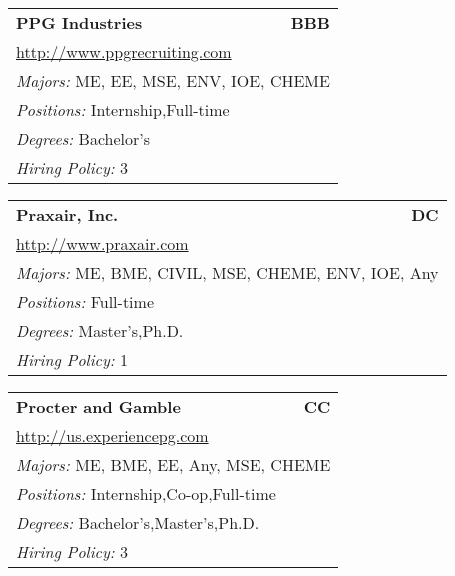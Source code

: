 \documentclass[twoside]{article}
\begin{document}
\begin{center}
\begin{multicols}{3}
\begin{FlushLeft}
\begin{minipage}{.9\columnwidth}
\end{minipage}
 
\begin{minipage}{.9\columnwidth}\begin{tabularx}{.95\columnwidth}{Xr}
                 {\Large\bf PPG Industries} & {\Large\bf BBB}\\
    \multicolumn{2}{p{.95\columnwidth}}{\url{http://www.ppgrecruiting.com}}\\
    \multicolumn{2}{p{.95\columnwidth}}{\emph{Majors:} ME, EE, MSE, ENV, IOE, CHEME}\\
    \multicolumn{2}{p{.95\columnwidth}}{\emph{Positions:} Internship,Full-time}\\
    \multicolumn{2}{p{.95\columnwidth}}{\emph{Degrees:} Bachelor's}\\
    \multicolumn{2}{p{.95\columnwidth}}{\emph{Hiring Policy:} 3}\\
    \end{tabularx}
    
\end{minipage}
 
\begin{minipage}{.9\columnwidth}\begin{tabularx}{.95\columnwidth}{Xr}
                 {\Large\bf Praxair, Inc.} & {\Large\bf DC}\\
    \multicolumn{2}{p{.95\columnwidth}}{\url{http://www.praxair.com}}\\
    \multicolumn{2}{p{.95\columnwidth}}{\emph{Majors:} ME, BME, CIVIL, MSE, CHEME, ENV, IOE, Any}\\
    \multicolumn{2}{p{.95\columnwidth}}{\emph{Positions:} Full-time}\\
    \multicolumn{2}{p{.95\columnwidth}}{\emph{Degrees:} Master's,Ph.D.}\\
    \multicolumn{2}{p{.95\columnwidth}}{\emph{Hiring Policy:} 1}\\
    \end{tabularx}
    
\end{minipage}
 
\begin{minipage}{.9\columnwidth}\begin{tabularx}{.95\columnwidth}{Xr}
                 {\Large\bf Procter and Gamble} & {\Large\bf CC}\\
    \multicolumn{2}{p{.95\columnwidth}}{\url{http://us.experiencepg.com}}\\
    \multicolumn{2}{p{.95\columnwidth}}{\emph{Majors:} ME, BME, EE, Any, MSE, CHEME}\\
    \multicolumn{2}{p{.95\columnwidth}}{\emph{Positions:} Internship,Co-op,Full-time}\\
    \multicolumn{2}{p{.95\columnwidth}}{\emph{Degrees:} Bachelor's,Master's,Ph.D.}\\
    \multicolumn{2}{p{.95\columnwidth}}{\emph{Hiring Policy:} 3}\\
    \end{tabularx}
    

\end{minipage}
\end{FlushLeft}
\end{multicols}
\end{center}
\end{document}
